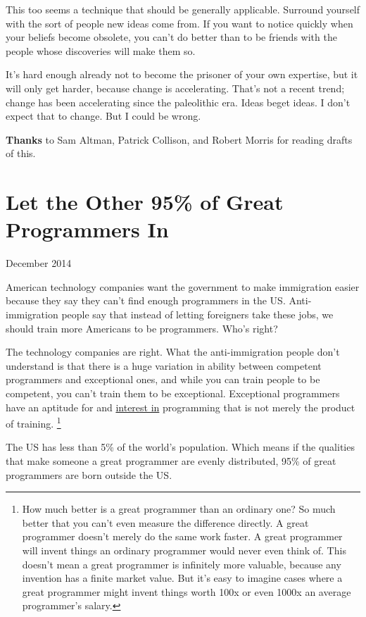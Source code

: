 \documentclass[12pt]{book}
\begin{document}
This too seems a technique that should be generally applicable. Surround
yourself with the sort of people new ideas come from. If you want to
notice quickly when your beliefs become obsolete, you can't do better
than to be friends with the people whose discoveries will make them so.

It's hard enough already not to become the prisoner of your own
expertise, but it will only get harder, because change is accelerating.
That's not a recent trend; change has been accelerating since the
paleolithic era. Ideas beget ideas. I don't expect that to change. But I
could be wrong.


\textbf{Thanks} to Sam Altman, Patrick Collison, and Robert Morris for
reading drafts of this.
\chapter{Let the Other 95\% of Great Programmers In}

December 2014

American technology companies want the government to make immigration
easier because they say they can't find enough programmers in the US.
Anti-immigration people say that instead of letting foreigners take
these jobs, we should train more Americans to be programmers. Who's
right?

The technology companies are right. What the anti-immigration people
don't understand is that there is a huge variation in ability between
competent programmers and exceptional ones, and while you can train
people to be competent, you can't train them to be exceptional.
Exceptional programmers have an aptitude for and
\href{genius.html}{interest in} programming that is not merely the
product of training. \footnote{How much better is a great programmer than an ordinary one? So
much better that you can't even measure the difference directly. A great
programmer doesn't merely do the same work faster. A great programmer
will invent things an ordinary programmer would never even think of.
This doesn't mean a great programmer is infinitely more valuable,
because any invention has a finite market value. But it's easy to
imagine cases where a great programmer might invent things worth 100x or
even 1000x an average programmer's salary.}

The US has less than 5\% of the world's population. Which means if the
qualities that make someone a great programmer are evenly distributed,
95\% of great programmers are born outside the US.
\end{document}
